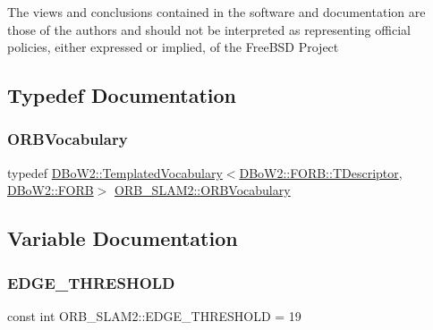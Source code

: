 The views and conclusions contained in the software and documentation are those of the authors and should not be interpreted as representing official policies, either expressed or implied, of the Free\+B\+SD Project 

\subsection{Typedef Documentation}
\mbox{\label{namespace_o_r_b___s_l_a_m2_a2fafba714858cab1bb18d438e2e83c5d}} 
\subsubsection{\texorpdfstring{O\+R\+B\+Vocabulary}{ORBVocabulary}}
{\footnotesize\ttfamily typedef \mbox{\hyperlink{class_d_bo_w2_1_1_templated_vocabulary}{D\+Bo\+W2\+::\+Templated\+Vocabulary}}$<$\mbox{\hyperlink{class_d_bo_w2_1_1_f_o_r_b_aef9b966d0293836fab9f55f1799ce0ed}{D\+Bo\+W2\+::\+F\+O\+R\+B\+::\+T\+Descriptor}}, \mbox{\hyperlink{class_d_bo_w2_1_1_f_o_r_b}{D\+Bo\+W2\+::\+F\+O\+RB}}$>$ \mbox{\hyperlink{namespace_o_r_b___s_l_a_m2_a2fafba714858cab1bb18d438e2e83c5d}{O\+R\+B\+\_\+\+S\+L\+A\+M2\+::\+O\+R\+B\+Vocabulary}}}



\subsection{Variable Documentation}
\mbox{\label{namespace_o_r_b___s_l_a_m2_aec00f1ad4dea35755e3af4404282cd3b}} 
\subsubsection{\texorpdfstring{E\+D\+G\+E\+\_\+\+T\+H\+R\+E\+S\+H\+O\+LD}{EDGE\_THRESHOLD}}
{\footnotesize\ttfamily const int O\+R\+B\+\_\+\+S\+L\+A\+M2\+::\+E\+D\+G\+E\+\_\+\+T\+H\+R\+E\+S\+H\+O\+LD = 19}

